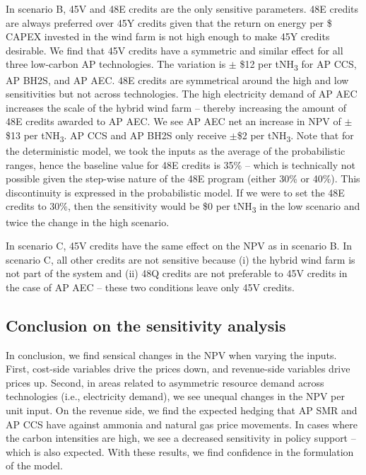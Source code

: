 \documentclass{article}
\begin{document}
In scenario B, 45V and 48E credits are the only sensitive parameters. 48E credits are always preferred over 45Y credits given that the return on energy per \$ CAPEX invested in the wind farm is not high enough to make 45Y credits desirable. We find that 45V credits have a symmetric and similar effect for all three low-carbon AP technologies. The variation is $\pm$ \$12 per tNH\textsubscript{3} for AP CCS, AP BH2S, and AP AEC. 48E credits are symmetrical around the high and low sensitivities but not across technologies. The high electricity demand of AP AEC increases the scale of the hybrid wind farm – thereby increasing the amount of 48E credits awarded to AP AEC. We see AP AEC net an increase in NPV of $\pm$ \$13 per tNH\textsubscript{3}. AP CCS and AP BH2S only receive $\pm$\$2 per tNH\textsubscript{3}. Note that for the deterministic model, we took the inputs as the average of the probabilistic ranges, hence the baseline value for 48E credits is 35\% – which is technically not possible given the step-wise nature of the 48E program (either 30\% or 40\%). This discontinuity is expressed in the probabilistic model. If we were to set the 48E credits to 30\%, then the sensitivity would be \$0 per tNH\textsubscript{3} in the low scenario and twice the change in the high scenario.

In scenario C, 45V credits have the same effect on the NPV as in scenario B. In scenario C, all other credits are not sensitive because (i) the hybrid wind farm is not part of the system and (ii) 48Q credits are not preferable to 45V credits in the case of AP AEC – these two conditions leave only 45V credits.

\subsection{Conclusion on the sensitivity analysis}

In conclusion, we find sensical changes in the NPV when varying the inputs. First, cost-side variables drive the prices down, and revenue-side variables drive prices up. Second, in areas related to asymmetric resource demand across technologies (i.e., electricity demand), we see unequal changes in the NPV per unit input. On the revenue side, we find the expected hedging that AP SMR and AP CCS have against ammonia and natural gas price movements. In cases where the carbon intensities are high, we see a decreased sensitivity in policy support – which is also expected. With these results, we find confidence in the formulation of the model.
\end{document}
